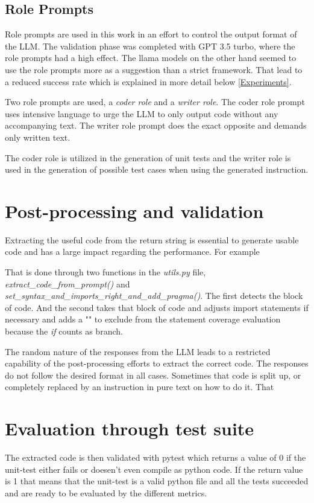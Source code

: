 \documentclass[a4paper,11pt,oneside]{memoir}
\begin{document}
\subsection{Role Prompts}
Role prompts are used in this work in an effort to control the output format of the LLM. The validation phase was completed with GPT 3.5 turbo, where the role prompts had a high effect. The llama models on the other hand seemed to use the role prompts more as a suggestion than a strict framework. That lead to a reduced success rate which is explained in more detail below \ref{Experiments}.

Two role prompts are used, a \textit{coder role} and a \textit{writer role}. The coder role prompt uses intensive language to urge the LLM to only output code without any accompanying text. The writer role prompt does the exact opposite and demands only written text.

The coder role is utilized in the generation of unit tests and the writer role is used in the generation of possible test cases when using the generated instruction.
 
\section{Post-processing and validation}
Extracting the useful code from the return string is essential to generate usable code and has a large impact regarding the performance. For example 

\text
That is done through two functions in the \textit{utils.py} file, \textit{extract\_code\_from\_prompt()} and \textit{set\_syntax\_and\_imports\_right\_and\_add\_pragma()}. The first detects the block of code. And the second takes that block of code and adjusts import statements if necessary and adds a "\textit{}" to exclude \textit{} from the statement coverage evaluation because the \textit{if} counts as branch.   

The random nature of the responses from the LLM leads to a restricted capability of the post-processing efforts to extract the correct code. The responses do not follow the desired format in all cases. Sometimes that code is split up, or completely replaced by an instruction in pure text on how to do it.
That 

\section{Evaluation through test suite}
The extracted code is then validated with pytest which returns a value of 0 if the unit-test either fails or doesen't even compile as python code. If the return value is 1 that means that the unit-test is a valid python file and all the tests succeeded and are ready to be evaluated by the different metrics.
\end{document}
